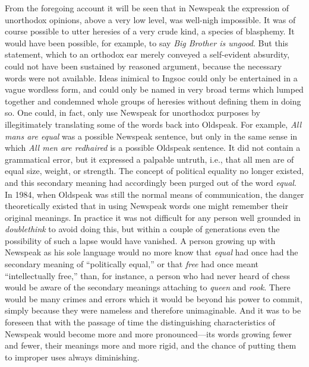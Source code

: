 \begin{paracol}{2}
From the foregoing account it will be seen that in Newspeak the
expression of unorthodox opinions, above a very low level, was well-nigh
impossible. It was of course possible to utter heresies of a very crude
kind, a species of blasphemy. It would have been possible, for example,
to say \emph{Big Brother is ungood}. But this statement, which to an
orthodox ear merely conveyed a self-evident absurdity, could not have
been sustained by reasoned argument, because the necessary words were
not available. Ideas inimical to Ingsoc could only be entertained in a
vague wordless form, and could only be named in very broad terms which
lumped together and condemned whole groups of heresies without defining
them in doing so. One could, in fact, only use Newspeak for unorthodox
purposes by illegitimately translating some of the words back into
Oldspeak. For example, \emph{All mans are equal} was a possible Newspeak
sentence, but only in the same sense in which \emph{All men are
redhaired} is a possible Oldspeak sentence. It did not contain a
grammatical error, but it expressed a palpable untruth, i.e., that all
men are of equal size, weight, or strength. The concept of political
equality no longer existed, and this secondary meaning had accordingly
been purged out of the word \emph{equal}. In 1984, when Oldspeak was
still the normal means of communication, the danger theoretically
existed that in using Newspeak words one might remember their original
meanings. In practice it was not difficult for any person well grounded
in \emph{doublethink} to avoid doing this, but within a couple of
generations even the possibility of such a lapse would have vanished. A
person growing up with Newspeak as his sole language would no more know
that \emph{equal} had once had the secondary meaning of ``politically
equal,'' or that \emph{free} had once meant ``intellectually free,'' than,
for instance, a person who had never heard of chess would be aware of
the secondary meanings attaching to \emph{queen} and \emph{rook}. There
would be many crimes and errors which it would be beyond his power to
commit, simply because they were nameless and therefore unimaginable.
And it was to be foreseen that with the passage of time the
distinguishing characteristics of Newspeak would become more and more
pronounced---its words growing fewer and fewer, their meanings more and
more rigid, and the chance of putting them to improper uses always
diminishing.

\switchcolumn


\end{paracol}
